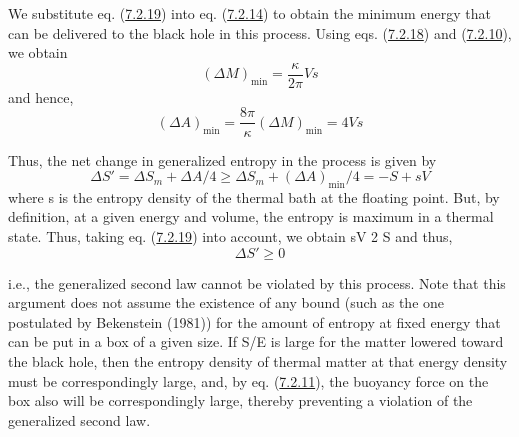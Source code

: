 \documentclass[11pt,a4paper]{article}
\begin{document}
We substitute eq. (\hyperref[eq:7.2.19]{7.2.19}) into eq. (\hyperref[eq:7.2.14]{7.2.14}) to obtain the minimum energy that can be delivered to the black hole in this process. Using eqs. (\hyperref[eq:7.2.18]{7.2.18}) and (\hyperref[eq:7.2.10]{7.2.10}), we obtain
\begin{equation*}
(\Delta M)_{\mathrm{min}} = \frac{\kappa}{2\pi} Vs \tag{7.2.20}\label{eq:7.2.20}
\end{equation*}
and hence,
\begin{equation*}
(\Delta A)_{\mathrm{min}} = \frac{8\pi}{\kappa} (\Delta M)_{\mathrm{min}} = 4Vs \tag{7.2.21}\label{eq:7.2.21}
\end{equation*}

Thus, the net change in generalized entropy in the process is given by
\begin{equation*}
\Delta S' = \Delta S_m + \Delta A/4 \ge \Delta S_m + (\Delta A)_{\mathrm{min}}/4 = -S + sV \tag{7.2.22}\label{eq:7.2.22}
\end{equation*}
where s is the entropy density of the thermal bath at the floating point. But, by definition, at a given energy and volume, the entropy is maximum in a thermal state. Thus, taking eq. (\hyperref[eq:7.2.19]{7.2.19}) into account, we obtain sV 2 S and thus,
\begin{equation*}
\Delta S' \ge 0 \tag{7.2.23}\label{eq:7.2.23}
\end{equation*}

i.e., the generalized second law cannot be violated by this process. Note that this argument does not assume the existence of any bound (such as the one postulated by Bekenstein (1981)) for the amount of entropy at fixed energy that can be put in a box of a given size. If S/E is large for the matter lowered toward the black hole, then the entropy density of thermal matter at that energy density must be \hypertarget{source-184}{} correspondingly large, and, by eq. (\hyperref[eq:7.2.11]{7.2.11}), the buoyancy force on the box also will be correspondingly large, thereby preventing a violation of the generalized second law.
\end{document}
